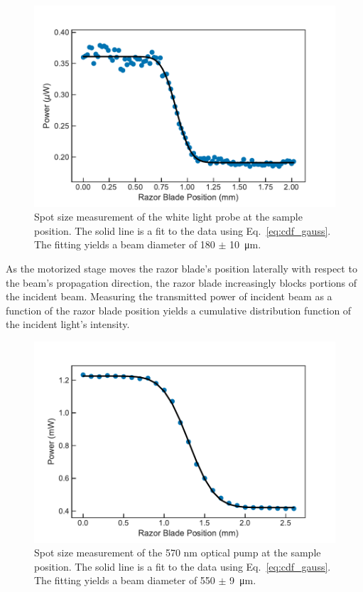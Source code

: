 \begin{figure}[ht]
	\centering
	\includegraphics[scale=0.65]{images/chapter_methods/probe_spot_size}
	\caption{Spot size measurement of the white light probe at the sample position. The solid line is a fit to the data using Eq.\ \ref{eq:cdf_gauss}. The fitting yields a beam diameter of 180 $\pm$ \SI{10}{\micro\meter}. }
\end{figure}


As the motorized stage moves the razor blade's position laterally with respect to the beam's propagation direction, the razor blade increasingly blocks portions of the incident beam.  Measuring the transmitted power of incident beam as a function of the razor blade position yields a cumulative distribution function of the incident light's intensity.

\begin{figure}[ht]
	\centering
	\includegraphics[scale=0.65]{images/chapter_methods/pump_spot_size}
	\caption{Spot size measurement of the 570 nm optical pump at the sample position. The solid line is a fit to the data using Eq.\ \ref{eq:cdf_gauss}. The fitting yields a beam diameter of 550 $\pm$ \SI{9}{\micro\meter}.}
\end{figure}

